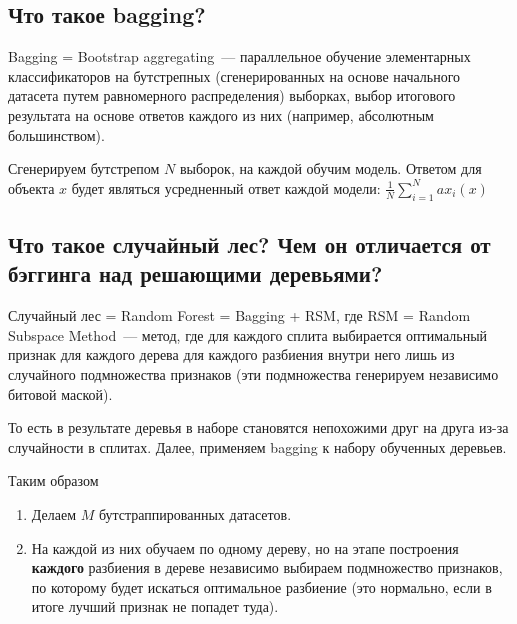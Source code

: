 \subsection{Что такое bagging?}

\begin{definition}
    Bagging = Bootstrap aggregating~--- параллельное обучение элементарных классификаторов на бутстрепных (сгенерированных на основе начального датасета путем равномерного распределения) выборках, выбор итогового результата на основе ответов каждого из них (например, абсолютным большинством).
\end{definition}

Сгенерируем бутстрепом $N$ выборок, на каждой обучим модель. Ответом для объекта $x$ будет являться усредненный ответ каждой модели: $\frac{1}{N} \sum \limits_{i=1}^{N} a x_i(x)$













\subsection{Что такое случайный лес? Чем он отличается от бэггинга над решающими деревьями?}

Случайный лес = Random Forest = Bagging + RSM, где 
RSM = Random Subspace Method~--- метод, где для каждого сплита выбирается оптимальный признак для каждого дерева для каждого разбиения внутри него лишь из случайного подмножества признаков (эти подмножества генерируем независимо битовой маской).

То есть в результате деревья в наборе становятся непохожими друг на друга из-за случайности в сплитах. Далее, применяем bagging к набору обученных деревьев.

Таким образом
\begin{enumerate}
    \item Делаем $M$ бутстраппированных датасетов.
    \item На каждой из них обучаем по одному дереву, но на этапе построения \textbf{каждого} разбиения в дереве независимо выбираем подмножество признаков, по которому будет искаться оптимальное разбиение (это нормально, если в итоге лучший признак не попадет туда).
\end{enumerate}














